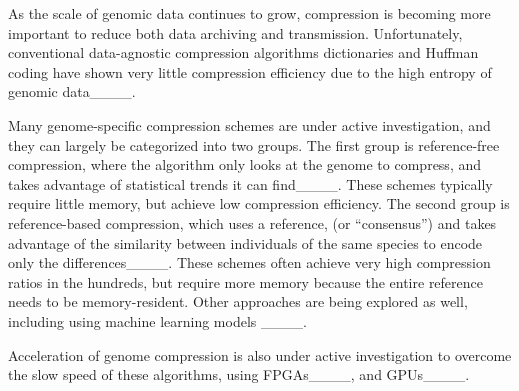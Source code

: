 As the scale of genomic data continues to grow, compression is becoming more important to reduce both data archiving and transmission.
Unfortunately, conventional data-agnostic compression algorithms dictionaries and Huffman coding have shown very little compression efficiency due to the high entropy of genomic data____.

Many genome-specific compression schemes are under active investigation, and they can largely be categorized into two groups.
The first group is reference-free compression, where the algorithm only looks at the genome to compress, and takes advantage of statistical trends it can find____.
These schemes typically require little memory, but achieve low compression efficiency.
The second group is reference-based compression, which uses a reference, (or ``consensus'') and takes advantage of the similarity between individuals of the same species to encode only the differences____.
These schemes often achieve very high compression ratios in the hundreds, but require more memory because the entire reference needs to be memory-resident.
Other approaches are being explored as well, including using machine learning models ____.

Acceleration of genome compression is also under active investigation to overcome the slow speed of these algorithms, using FPGAs____, and GPUs____.